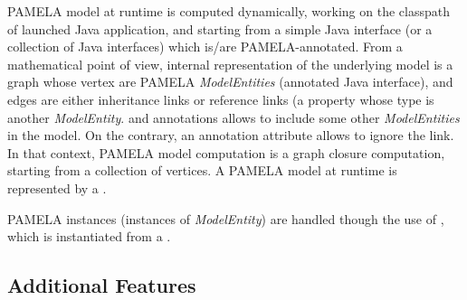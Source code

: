 PAMELA model at runtime is computed dynamically, working on the classpath of launched Java application, and starting from a simple Java interface (or a collection of Java interfaces) which is/are PAMELA-annotated. From a mathematical point of view, internal representation of the underlying model is a graph whose vertex are PAMELA \emph{ModelEntities} (annotated Java interface), and edges are either inheritance links or reference links (a property whose type is another \emph{ModelEntity}.  and  annotations allows to include some other \emph{ModelEntities} in the model. On the contrary, an annotation attribute  allows to ignore the link. In that context, PAMELA model computation is a graph closure computation, starting from a collection of vertices.
A PAMELA model at runtime is represented by a .

PAMELA instances (instances of \emph{ModelEntity}) are handled though the use of , which is instantiated from a .


\subsection{Additional Features}

